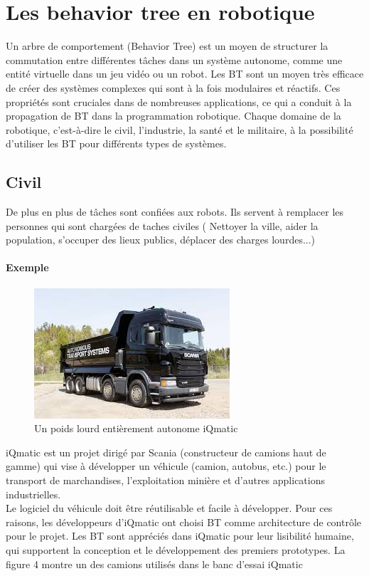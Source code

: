 \documentclass[titlepage]{article}
\begin{document}
	\section{Les behavior tree en robotique}
			Un arbre de comportement (Behavior Tree) est un moyen de structurer la commutation entre différentes tâches dans un système autonome, comme une entité virtuelle dans un jeu vidéo ou un robot. Les BT sont un moyen très efficace de créer des systèmes complexes qui sont à la fois modulaires et réactifs. Ces propriétés sont cruciales dans de nombreuses applications, ce qui a conduit à la propagation de BT dans la programmation robotique. Chaque domaine de la robotique, c'est-à-dire le civil, l'industrie, la santé et le militaire, à la possibilité d'utiliser les BT pour différents types de systèmes.  
		\subsection{Civil}
		De plus en plus de tâches sont confiées aux robots. Ils servent à remplacer les personnes qui sont chargées de taches civiles ( Nettoyer la ville, aider la population, s'occuper des lieux publics, déplacer des charges lourdes...)
		\paragraph{Exemple}
		\begin{figure}[h!]
			\includegraphics[width=\linewidth]{img/vehicul.jpg}
			\caption{Un poids lourd entièrement autonome iQmatic}
			\label{fig:civil}
		\end{figure}	
		iQmatic \cite{kth} est un projet dirigé par Scania (constructeur de camions haut de gamme) qui vise à développer un véhicule (camion, autobus, etc.) pour le transport de marchandises, l’exploitation minière et d’autres applications industrielles. 
		\\
		Le logiciel du véhicule doit être réutilisable et facile à développer. Pour ces raisons, les développeurs d’iQmatic ont choisi BT comme architecture de contrôle pour le projet.
		Les BT sont appréciés dans iQmatic pour leur lisibilité humaine, qui supportent la conception et le développement des premiers prototypes. La figure 4 montre un des camions utilisés dans le banc d’essai iQmatic
\end{document}
